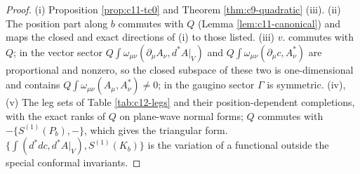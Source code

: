 \begin{proof}
(i) Proposition \ref{prop:c11-tc0} and Theorem \ref{thm:c9-quadratic} (iii). (ii) The position part along $b$ commutes with $Q$ (Lemma \ref{lem:c11-canonical}) and maps the closed and exact directions of (i) to those listed. (iii) $v.$ commutes with $Q$; in the vector sector $Q\int\omega_{\mu\nu}(\partial_\mu A_\nu,d^*A|_V)$ and $Q\int\omega_{\mu\nu}(\partial_\mu c,A^*_\nu)$ are proportional and nonzero, so the closed subspace of these two is one-dimensional and contains $Q\int\omega_{\mu\nu}(A_\mu,A^*_\nu)\neq0$; in the gaugino sector $\Gamma$ is symmetric. (iv), (v) The leg sets of Table \ref{tab:c12-legs} and their position-dependent completions, with the exact ranks of $Q$ on plane-wave normal forms; $Q$ commutes with $-\{S^{(1)}(P_b),-\}$, which gives the triangular form. $\{\int(d^*dc,d^*A|_V),S^{(1)}(K_b)\}$ is the variation of a functional outside the special conformal invariants.
\end{proof}

